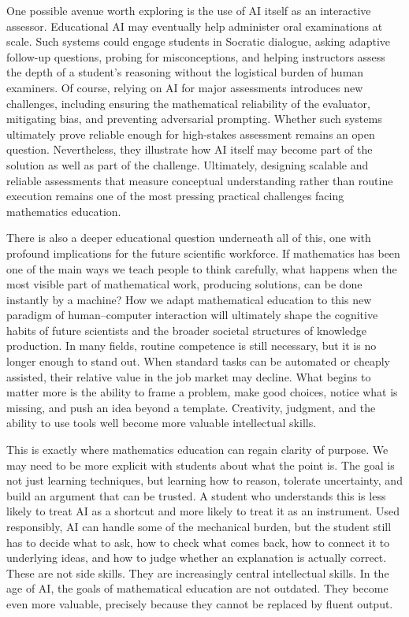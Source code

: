 \documentclass[12pt]{article}
\begin{document}
One possible avenue worth exploring is the use of AI itself as an interactive assessor. Educational AI may eventually help administer oral examinations at scale. Such systems could engage students in Socratic dialogue, asking adaptive follow-up questions, probing for misconceptions, and helping instructors assess the depth of a student's reasoning without the logistical burden of human examiners. Of course, relying on AI for major assessments introduces new challenges, including ensuring the mathematical reliability of the evaluator, mitigating bias, and preventing adversarial prompting. Whether such systems ultimately prove reliable enough for high-stakes assessment remains an open question. Nevertheless, they illustrate how AI itself may become part of the solution as well as part of the challenge. Ultimately, designing scalable and reliable assessments that measure conceptual understanding rather than routine execution remains one of the most pressing practical challenges facing mathematics education.

There is also a deeper educational question underneath all of this, one with profound implications for the future scientific workforce. If mathematics has been one of the main ways we teach people to think carefully, what happens when the most visible part of mathematical work, producing solutions, can be done instantly by a machine? How we adapt mathematical education to this new paradigm of human--computer interaction will ultimately shape the cognitive habits of future scientists and the broader societal structures of knowledge production. In many fields, routine competence is still necessary, but it is no longer enough to stand out. When standard tasks can be automated or cheaply assisted, their relative value in the job market may decline. What begins to matter more is the ability to frame a problem, make good choices, notice what is missing, and push an idea beyond a template. Creativity, judgment, and the ability to use tools well become more valuable intellectual skills.

This is exactly where mathematics education can regain clarity of purpose. We may need to be more explicit with students about what the point is. The goal is not just learning techniques, but learning how to reason, tolerate uncertainty, and build an argument that can be trusted. A student who understands this is less likely to treat AI as a shortcut and more likely to treat it as an instrument. Used responsibly, AI can handle some of the mechanical burden, but the student still has to decide what to ask, how to check what comes back, how to connect it to underlying ideas, and how to judge whether an explanation is actually correct. These are not side skills. They are increasingly central intellectual skills. In the age of AI, the goals of mathematical education are not outdated. They become even more valuable, precisely because they cannot be replaced by fluent output.
\end{document}
